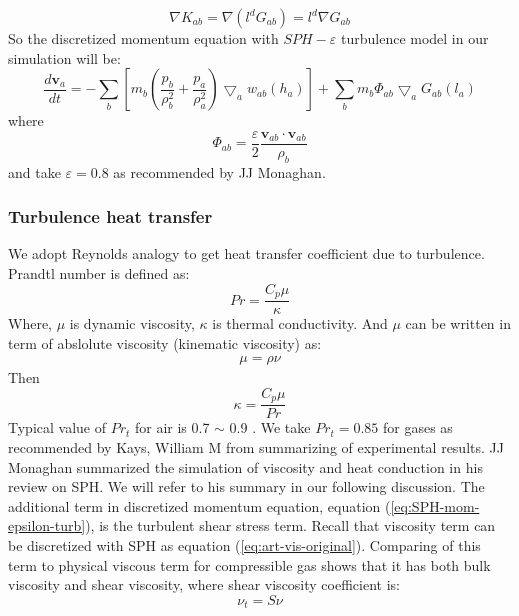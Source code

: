 \documentclass[10pt,a4paper]{article}
\begin{document}
\begin{equation}
\nabla K_{ab} = \nabla (l^d G_{ab}) = l^d \nabla G_{ab}
\end{equation}
So the discretized momentum equation with $SPH-\varepsilon$ turbulence model in our simulation will be:
\begin{equation}
\label{eq:SPH-mom-epsilon-turb}
\dfrac{d \textbf{v}_a}{dt} = -\sum_b [m_b (\dfrac{p_b}{\rho_b^2} + \dfrac{p_a}{\rho_a^2}) \bigtriangledown_aw_{a b}(h_a)] + \sum_b m_b \Phi_{ab}\bigtriangledown_aG_{ab}(l_a)
\end{equation}
where 
\begin{equation}
\Phi_{ab}=\dfrac{\varepsilon}{2} \dfrac{\textbf{v}_{ab} \cdot \textbf{v}_{ab}}{\rho_b} 
\end{equation}
and take $\varepsilon = 0.8$ as recommended by JJ Monaghan.
\subsubsection{Turbulence heat transfer}
We adopt Reynolds analogy to get heat transfer coefficient due to turbulence.
Prandtl number is defined as:
\begin{equation}
Pr=\dfrac{C_p \mu}{\kappa}
\end{equation}
Where, $\mu$ is dynamic viscosity, $\kappa$ is thermal conductivity. And $\mu$  can be written in term of abslolute viscosity (kinematic viscosity) as:
\begin{align}
\mu=\rho \nu
\end{align}
Then
\begin{equation}
\kappa=\dfrac{C_p \mu}{Pr}
\end{equation}
Typical value of $Pr_t$ for air is 0.7 $\sim$ 0.9 . We take $Pr_t=0.85$ for gases as recommended by Kays, William M \cite{kays1994turbulent} from summarizing of experimental results. 
JJ Monaghan \citep{monaghan2005smoothed} summarized the simulation of viscosity and heat conduction in his review on SPH. We will refer to his summary in our following discussion. The additional term in discretized momentum equation, equation (\ref{eq:SPH-mom-epsilon-turb}), is the turbulent shear stress term. 
Recall that viscosity term can be discretized with SPH as equation (\ref{eq:art-vis-original}). 
Comparing of this term to physical viscous term for compressible gas shows that it has both bulk viscosity and shear viscosity, where shear viscosity coefficient is\cite{monaghan2005smoothed}:\\
\begin{equation}
\nu_t = S \nu
\end{equation}
\end{document}
